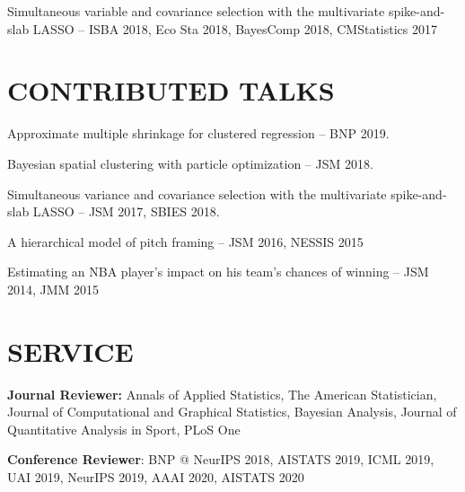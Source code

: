 \documentclass[margin]{res}
\begin{document}
\begin{resume}


Simultaneous variable and covariance selection with the multivariate spike-and-slab LASSO -- ISBA 2018, Eco Sta 2018, BayesComp 2018, CMStatistics 2017




\section{CONTRIBUTED \hspace{0.1in} TALKS}

Approximate multiple shrinkage for clustered regression -- BNP 2019.

Bayesian spatial clustering with particle optimization -- JSM 2018. 

Simultaneous variance and covariance selection with the multivariate spike-and-slab LASSO -- JSM 2017, SBIES 2018.

A hierarchical model of pitch framing -- JSM 2016, NESSIS 2015


Estimating an NBA player's impact on his team's chances of winning -- JSM 2014, JMM 2015





\section{SERVICE}
\textbf{Journal Reviewer:} Annals of Applied Statistics, The American Statistician, Journal of Computational and Graphical Statistics, Bayesian Analysis, Journal of Quantitative Analysis in Sport, PLoS One

\textbf{Conference Reviewer}: BNP @ NeurIPS 2018, AISTATS 2019, ICML 2019, UAI 2019, NeurIPS 2019, AAAI 2020, AISTATS 2020



\end{resume} 
\end{document}
